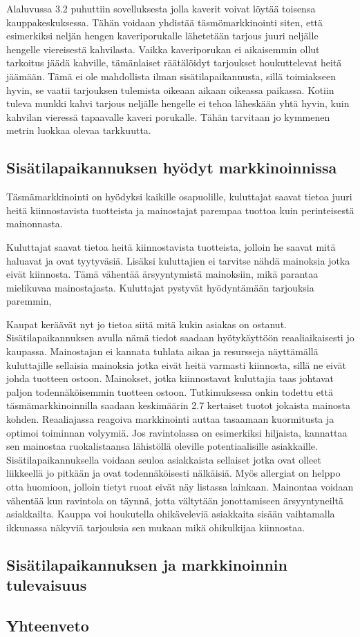 Alaluvussa 3.2 puhuttiin sovelluksesta jolla kaverit voivat löytää toisensa kauppakeskuksessa. Tähän voidaan yhdistää täsmömarkkinointi siten, että esimerkiksi neljän hengen kaveriporukalle lähetetään tarjous juuri neljälle hengelle viereisestä kahvilasta. Vaikka kaveriporukan ei aikaisemmin ollut tarkoitus jäädä kahville, tämänlaiset räätälöidyt tarjoukset houkuttelevat heitä jäämään. Tämä ei ole mahdollista ilman sisätilapaikannusta, sillä toimiakseen hyvin, se vaatii tarjouksen tulemista oikeaan aikaan oikeassa paikassa. Kotiin tuleva munkki kahvi tarjous neljälle hengelle ei tehoa läheskään yhtä hyvin, kuin kahvilan vieressä tapaavalle kaveri porukalle. Tähän tarvitaan jo kymmenen metrin luokkaa olevaa tarkkuutta.




\subsection{Sisätilapaikannuksen hyödyt markkinoinnissa}
Täsmämarkkinointi on hyödyksi kaikille osapuolille, kuluttajat saavat tietoa juuri heitä kiinnostavista tuotteista ja mainostajat parempaa tuottoa kuin perinteisestä mainonnasta.



Kuluttajat saavat tietoa heitä kiinnostavista tuotteista, jolloin he saavat mitä haluavat ja ovat tyytyväsiä. Lisäksi kuluttajien ei tarvitse nähdä mainoksia jotka eivät kiinnosta. Tämä vähentää ärsyyntymistä mainoksiin, mikä parantaa mielikuvaa mainostajasta. Kuluttajat pystyvät hyödyntämään tarjouksia paremmin,
 

Kaupat keräävät nyt jo tietoa siitä mitä kukin asiakas on ostanut. Sisätilapaikannuksen avulla nämä tiedot saadaan hyötykäyttöön reaaliaikaisesti jo kaupassa.
Mainostajan ei kannata tuhlata aikaa ja resursseja näyttämällä kuluttajille sellaisia mainoksia jotka eivät heitä varmasti kiinnosta, sillä ne eivät johda tuotteen ostoon. Mainokset, jotka kiinnostavat kuluttajia taas johtavat paljon todennäköisemmin tuotteen ostoon. Tutkimuksessa\cite{target} onkin todettu että täsmämarkkinoinnilla saadaan keskimäärin 2.7 kertaiset tuotot jokaista mainosta kohden.
Reaaliajassa reagoiva markkinointi auttaa tasaamaan kuormitusta ja optimoi toiminnan volyymiä\cite{tasma}. Jos ravintolassa on esimerkiksi hiljaista, kannattaa sen mainostaa ruokalistaansa lähistöllä oleville potentiaalisille asiakkaille. Sisätilapaikannuksella voidaan seuloa asiakkaista sellaiset jotka ovat olleet liikkeellä jo pitkään ja ovat todennäköisesti nälkäisiä. Myös allergiat on helppo otta huomioon, jolloin tietyt ruoat eivät näy listassa lainkaan\cite{tasma}. Mainontaa voidaan vähentää kun ravintola on täynnä, jotta vältytään jonottamiseen ärsyyntyneiltä asiakkailta.
Kauppa voi houkutella ohikäveleviä asiakkaita sisään vaihtamalla ikkunassa näkyviä tarjouksia sen mukaan mikä ohikulkijaa kiinnostaa.
\subsection{Sisätilapaikannuksen ja markkinoinnin tulevaisuus}
\subsection{Yhteenveto}
